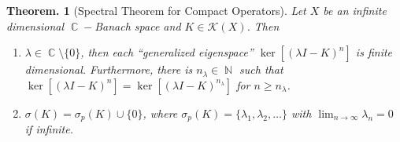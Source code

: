 \documentclass[11pt, a4paper]{memoir}
\DeclareMathOperator{\N}{{\mathbb{N}}}
\DeclareMathOperator{\C}{{\mathbb{C}}}
\theoremstyle{change}
\newtheorem{theorem}{Theorem.}[section]
\theoremstyle{plain}
\theoremstyle{nonumberplain}
\numberwithin{equation}{section}
\begin{document}
\begin{theorem}[Spectral Theorem for Compact Operators]
    Let $X$ be an infinite dimensional $\C-$Banach space and $K\in\mathcal{K}(X)$.
    Then
    \begin{enumerate}[nl,r]
        \item $\lambda\in\C\setminus\{0\}$, then each ``generalized eigenspace'' $\ker[(\lambda I-K)^n]$ is finite dimensional.
            Furthermore, there is $n_\lambda\in\N$ such that $\ker[(\lambda I-K)^n]=\ker[(\lambda I-K)^{n_\lambda}]$ for $n\geq n_\lambda$.
        \item $\sigma(K)=\sigma_p(K)\cup\{0\}$, where $\sigma_p(K)=\{\lambda_1,\lambda_2,\ldots\}$ with $\lim_{n\to\infty}\lambda_n=0$ if infinite.
    \end{enumerate}
\end{theorem}
\end{document}
